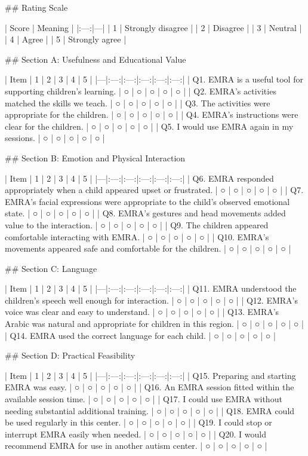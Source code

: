 ## Rating Scale

| Score | Meaning |
|:---:|---|
| 1 | Strongly disagree |
| 2 | Disagree |
| 3 | Neutral |
| 4 | Agree |
| 5 | Strongly agree |

## Section A: Usefulness and Educational Value

| Item | 1 | 2 | 3 | 4 | 5 |
|---|:---:|:---:|:---:|:---:|:---:|
| Q1. EMRA is a useful tool for supporting children’s learning. | ○ | ○ | ○ | ○ | ○ |
| Q2. EMRA’s activities matched the skills we teach. | ○ | ○ | ○ | ○ | ○ |
| Q3. The activities were appropriate for the children. | ○ | ○ | ○ | ○ | ○ |
| Q4. EMRA’s instructions were clear for the children. | ○ | ○ | ○ | ○ | ○ |
| Q5. I would use EMRA again in my sessions. | ○ | ○ | ○ | ○ | ○ |

## Section B: Emotion and Physical Interaction

| Item | 1 | 2 | 3 | 4 | 5 |
|---|:---:|:---:|:---:|:---:|:---:|
| Q6. EMRA responded appropriately when a child appeared upset or frustrated. | ○ | ○ | ○ | ○ | ○ |
| Q7. EMRA’s facial expressions were appropriate to the child’s observed emotional state. | ○ | ○ | ○ | ○ | ○ |
| Q8. EMRA’s gestures and head movements added value to the interaction. | ○ | ○ | ○ | ○ | ○ |
| Q9. The children appeared comfortable interacting with EMRA. | ○ | ○ | ○ | ○ | ○ |
| Q10. EMRA’s movements appeared safe and comfortable for the children. | ○ | ○ | ○ | ○ | ○ |

## Section C: Language

| Item | 1 | 2 | 3 | 4 | 5 |
|---|:---:|:---:|:---:|:---:|:---:|
| Q11. EMRA understood the children’s speech well enough for interaction. | ○ | ○ | ○ | ○ | ○ |
| Q12. EMRA’s voice was clear and easy to understand. | ○ | ○ | ○ | ○ | ○ |
| Q13. EMRA’s Arabic was natural and appropriate for children in this region. | ○ | ○ | ○ | ○ | ○ |
| Q14. EMRA used the correct language for each child. | ○ | ○ | ○ | ○ | ○ |

## Section D: Practical Feasibility

| Item | 1 | 2 | 3 | 4 | 5 |
|---|:---:|:---:|:---:|:---:|:---:|
| Q15. Preparing and starting EMRA was easy. | ○ | ○ | ○ | ○ | ○ |
| Q16. An EMRA session fitted within the available session time. | ○ | ○ | ○ | ○ | ○ |
| Q17. I could use EMRA without needing substantial additional training. | ○ | ○ | ○ | ○ | ○ |
| Q18. EMRA could be used regularly in this center. | ○ | ○ | ○ | ○ | ○ |
| Q19. I could stop or interrupt EMRA easily when needed. | ○ | ○ | ○ | ○ | ○ |
| Q20. I would recommend EMRA for use in another autism center. | ○ | ○ | ○ | ○ | ○ |

